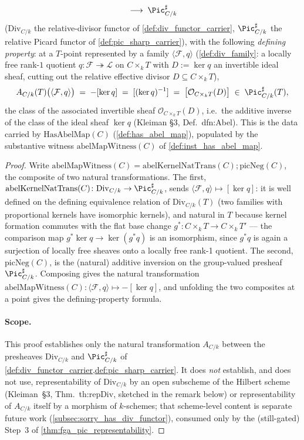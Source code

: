 \begin{lemma}
\[      \;\longrightarrow\; \Pic^\sharp_{C/k}
  \]
  (\(\mathrm{Div}_{C/k}\) the relative-divisor functor of
  \cref{def:div_functor_carrier}, \(\Pic^\sharp_{C/k}\) the relative
  Picard functor of \cref{def:pic_sharp_carrier}), with the following
  \emph{defining property}: at a \(T\)-point represented by a family
  \(\langle \mathcal F, q\rangle\) (\cref{def:div_family}: a locally free
  rank-\(1\) quotient \(q \colon \mathcal F \twoheadrightarrow
  \mathcal L\) on \(C \times_k T\) with \(D := \ker q\) an invertible
  ideal sheaf, cutting out the relative effective divisor \(D \subseteq C
  \times_k T\)),
  \[
    A_{C/k}(T)\bigl(\langle \mathcal F, q\rangle\bigr)
      \;=\; -[\ker q] \;=\; [(\ker q)^{-1}]
      \;=\; \bigl[\mathcal{O}_{C \times_k T}(D)\bigr]
      \;\in\; \Pic^\sharp_{C/k}(T),
  \]
  the class of the associated invertible sheaf \(\mathcal{O}_{C \times_k
  T}(D)\), i.e.\ the additive inverse of the class of the ideal sheaf
  \(\ker q\) (Kleiman \S 3, Def.~dfn:Abel). This is the data carried by
  \(\mathrm{HasAbelMap}(C)\) (\cref{def:has_abel_map}), populated by the
  substantive witness \(\mathrm{abelMapWitness}(C)\) of
  \cref{def:inst_has_abel_map}.
\end{lemma}

\begin{proof}
  Write \(\mathrm{abelMapWitness}(C) = \mathrm{abelKernelNatTrans}(C)
  \mathbin{;} \mathrm{picNeg}(C)\), the composite of two natural
  transformations. The first, \(\mathrm{abelKernelNatTrans}(C) \colon
  \mathrm{Div}_{C/k} \to \Pic^\sharp_{C/k}\), sends
  \(\langle \mathcal F, q\rangle \mapsto [\ker q]\): it is well defined
  on the defining equivalence relation of \(\mathrm{Div}_{C/k}(T)\)
  (two families with proportional kernels have isomorphic kernels), and
  natural in \(T\) because kernel formation commutes with the flat base
  change \(g^* \colon C \times_k T \to C \times_k T'\) --- the comparison
  map \(g^*\ker q \to \ker(g^*q)\) is an isomorphism, since \(g^*q\) is
  again a surjection of locally free sheaves onto a locally free rank-1
  quotient. The second, \(\mathrm{picNeg}(C)\), is the (natural) additive
  inversion on the group-valued presheaf \(\Pic^\sharp_{C/k}\).
  Composing gives the natural transformation
  \(\mathrm{abelMapWitness}(C) \colon \langle \mathcal F, q\rangle
  \mapsto -[\ker q]\), and unfolding the two composites at a point gives
  the defining-property formula.
  \paragraph{Scope.} This proof establishes only the natural
  transformation \(A_{C/k}\) between the presheaves
  \(\mathrm{Div}_{C/k}\) and \(\Pic^\sharp_{C/k}\) of
  \cref{def:div_functor_carrier,def:pic_sharp_carrier}. It does
  \emph{not} establish, and does not use, representability of
  \(\mathrm{Div}_{C/k}\) by an open subscheme of the Hilbert scheme
  (Kleiman~\S 3, Thm.~th:repDiv, sketched in the remark below) or
  representability of \(A_{C/k}\) itself by a morphism of \(k\)-schemes;
  that scheme-level content is separate future work
  (\cref{subsec:sorry_has_div_functor}), consumed only by the
  (still-gated) Step~3 of \cref{thm:fga_pic_representability}.
\end{proof}

